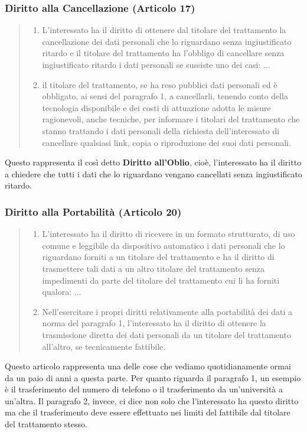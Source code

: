 \subsubsection*{Diritto alla Cancellazione (Articolo 17)}
\begin{quote}
    \begin{enumerate}
        \item L'interessato ha il diritto di ottenere dal titolare del trattamento la cancellazione dei dati personali che lo riguardano senza ingiustificato ritardo e il titolare del trattamento ha l'obbligo di cancellare senza ingiustificato ritardo i dati personali se sussiste uno dei casi: $\dots$
        \item il titolare del trattamento, se ha reso pubblici dati personali ed è obbligato, ai sensi del paragrafo 1, a cancellarli, tenendo conto della tecnologia disponibile e dei costi di attuazione adotta le misure ragionevoli, anche tecniche, per informare i titolari del trattamento che stanno trattando i dati personali della richiesta dell'interessato di cancellare qualsiasi link, copia o riproduzione dei suoi dati personali.
    \end{enumerate}
\end{quote}
Questo rappresenta il così detto \textbf{Diritto all'Oblio}, cioè, l'interessato ha il diritto a chiedere che tutti i dati che lo riguardano vengano cancellati senza ingiustificato ritardo.
\subsubsection*{Diritto alla Portabilità (Articolo 20)}
\begin{quote}
    \begin{enumerate}
        \item L'interessato ha il diritto di ricevere in un formato strutturato, di uso comune e leggibile da dispositivo automatico i dati personali che lo riguardano forniti a un titolare del trattamento e ha il diritto di trasmettere tali dati a un altro titolare del trattamento senza impedimenti da parte del titolare del trattamento cui li ha forniti qualora: $\dots$
        \item Nell'esercitare i propri diritti relativamente alla portabilità dei dati a norma del paragrafo 1, l'interessato ha il diritto di ottenere la trasmissione diretta dei dati personali da un titolare del trattamento all'altro, se tecnicamente fattibile.
    \end{enumerate}
\end{quote}
Questo articolo rappresenta una delle cose che vediamo quotidianamente ormai da un paio di anni a questa parte.
Per quanto riguarda il paragrafo 1, un esempio è il trasferimento del numero di telefono o il trasferimento da un'università a un'altra.
Il paragrafo 2, invece, ci dice non solo che l'interessato ha questo diritto ma che il trasferimento deve essere effettuato nei limiti del fattibile dal titolare del trattamento stesso.
